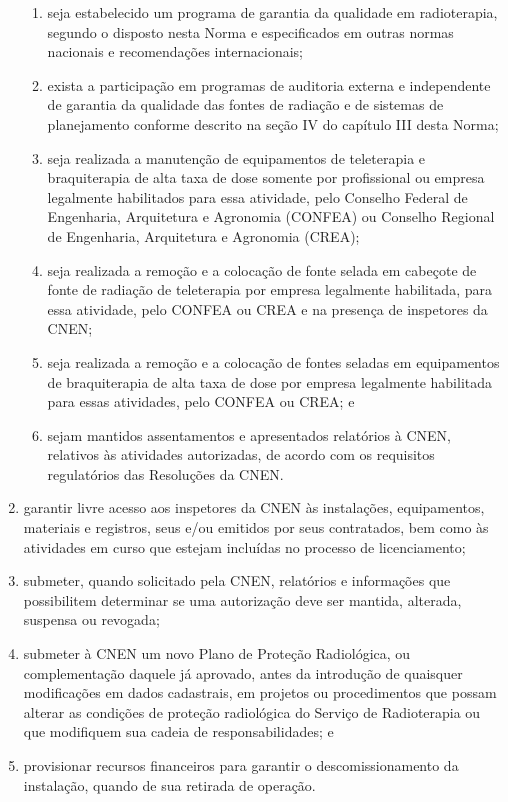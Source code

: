 \begin{enumerate}[label=\Roman*.]
\begin{enumerate}
        \item seja estabelecido um programa de garantia da qualidade em 	radioterapia, segundo o disposto nesta Norma e especificados em outras 	normas nacionais e recomendações internacionais;
        \item exista a participação em programas de auditoria externa e 	independente de garantia da qualidade das fontes de radiação e de sistemas de 	planejamento conforme descrito na seção IV do capítulo III desta Norma;
        \item seja realizada a manutenção de equipamentos de teleterapia e 	braquiterapia de alta taxa de dose somente por profissional ou empresa 	legalmente habilitados para essa atividade, pelo Conselho Federal de 	Engenharia, Arquitetura e Agronomia (CONFEA) ou Conselho Regional de Engenharia, Arquitetura e Agronomia (CREA);
        \item seja realizada a remoção e a colocação de fonte selada em 	cabeçote de fonte de radiação de teleterapia por empresa legalmente habilitada, 	para essa atividade, pelo CONFEA ou CREA e na presença de inspetores da 	CNEN;
        \item seja realizada a remoção e a colocação de fontes seladas em 	equipamentos de braquiterapia de alta taxa de dose por empresa legalmente 	habilitada para essas atividades, pelo CONFEA ou CREA; e
        \item sejam mantidos assentamentos e apresentados relatórios à CNEN, 	relativos às atividades autorizadas, de acordo com os requisitos regulatórios das 	Resoluções da CNEN.
    \end{enumerate}
    \item garantir livre acesso aos inspetores da CNEN às instalações, 	equipamentos, materiais e registros, seus e/ou emitidos por seus contratados, 	bem como às atividades em curso que estejam incluídas no processo de 	licenciamento;
    \item submeter, quando solicitado pela CNEN, relatórios e informações que possibilitem determinar se uma autorização deve ser mantida, alterada, suspensa ou revogada;
    \item submeter à CNEN um novo Plano de Proteção Radiológica, ou complementação daquele já aprovado, antes da introdução de quaisquer modificações em dados cadastrais, em projetos ou procedimentos que possam alterar as condições de proteção radiológica do Serviço de Radioterapia ou que modifiquem sua cadeia de responsabilidades; e
    \item provisionar recursos financeiros para garantir o descomissionamento da instalação, quando de sua retirada de operação.
\end{enumerate}